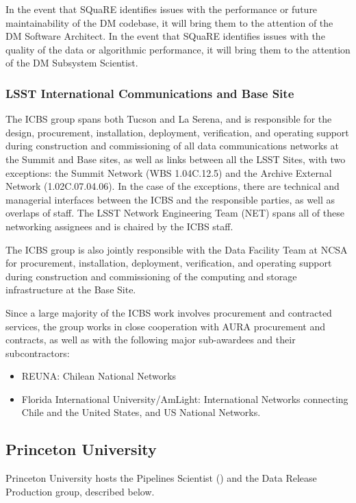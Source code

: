 In the event that SQuaRE identifies issues with the performance or future maintainability of the DM codebase, it will bring them to the attention of the DM Software Architect. In the event that SQuaRE identifies issues with the quality of the data or algorithmic performance, it will bring them to the attention of the DM Subsystem Scientist.

\subsubsection{LSST International Communications and Base Site}
The ICBS group spans both Tucson and La Serena, and is responsible for the design, procurement, installation, deployment, verification, and operating support during construction and commissioning of all data communications networks at the Summit and Base sites, as well as links between all the LSST Sites, with two exceptions:  the Summit Network (WBS 1.04C.12.5) and the Archive External Network (1.02C.07.04.06).  In the case of the exceptions, there are technical and managerial interfaces between the ICBS and the responsible parties, as well as overlaps of staff.  The LSST Network Engineering Team (NET) spans all of these networking assignees and is chaired by the ICBS staff.

The ICBS group is also jointly responsible with the Data Facility Team at NCSA for procurement, installation, deployment, verification, and operating support during construction and commissioning of the computing and storage infrastructure at the Base Site.

Since a large majority of the ICBS work involves procurement and contracted services, the group works in close cooperation with AURA procurement and contracts, as well as with the following major sub-awardees and their subcontractors:

\begin{itemize}
	\item REUNA: Chilean National Networks
	\item Florida International University/AmLight: International Networks connecting Chile and the United States, and US National Networks.
\end{itemize}

\subsection {Princeton University \label{sect:princeton}}

Princeton University hosts the Pipelines Scientist () and the Data Release Production group, described below.

